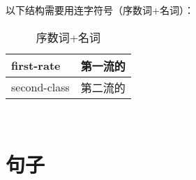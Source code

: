 \documentclass[UTF8]{ctexart}
\begin{document}
    以下结构需要用连字符号（序数词+名词）：\vspace{5pt}
    \begin{table}[h!]
        \begin{center}
            \ttfamily
            \begin{tabular}{p{160pt}|p{80pt}}
                \hline
                first-rate&第一流的\\ \hline
                second-class&第二流的\\ \hline
            \end{tabular}
            \rmfamily
            \caption{序数词+名词}
        \end{center}
    \end{table}\\

\newpage

\section{句子}
\end{document}
